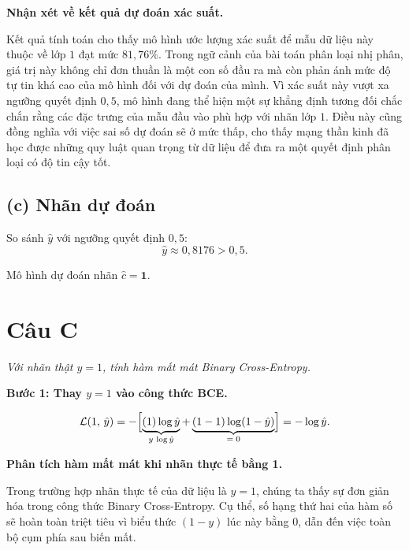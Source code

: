 \documentclass[12pt,a4paper]{article}
\begin{document}
\textbf{Nhận xét về kết quả dự đoán xác suất.}

Kết quả tính toán cho thấy mô hình ước lượng xác suất để mẫu dữ liệu này thuộc về lớp $1$ đạt mức $81,76\%$. Trong ngữ cảnh của bài toán phân loại nhị phân, giá trị này không chỉ đơn thuần là một con số đầu ra mà còn phản ánh mức độ tự tin khá cao của mô hình đối với dự đoán của mình. Vì xác suất này vượt xa ngưỡng quyết định $0,5$, mô hình đang thể hiện một sự khẳng định tương đối chắc chắn rằng các đặc trưng của mẫu đầu vào phù hợp với nhãn lớp $1$. Điều này cũng đồng nghĩa với việc sai số dự đoán sẽ ở mức thấp, cho thấy mạng thần kinh đã học được những quy luật quan trọng từ dữ liệu để đưa ra một quyết định phân loại có độ tin cậy tốt.

\bigskip
\subsection*{(c) Nhãn dự đoán}

So sánh $\hat{y}$ với ngưỡng quyết định $0{,}5$:
\[
  \hat{y} \approx 0{,}8176 > 0{,}5.
\]

\begin{ketqua}
Mô hình dự đoán nhãn $\hat{c} = \mathbf{1}$.
\end{ketqua}

\section*{Câu C}

\noindent\textit{Với nhãn thật $y = 1$, tính hàm mất mát Binary Cross-Entropy.}

\medskip

\noindent\textbf{Bước 1: Thay $y = 1$ vào công thức BCE.}

\[
  \mathcal{L}(1,\,\hat{y})
  = -\Bigl[
      \underbrace{(1)\log\hat{y}}_{y\,\log\hat{y}}
    + \underbrace{(1 - 1)\log(1 - \hat{y})}_{=\;0}
    \Bigr]
  = -\log\hat{y}.
\]

\textbf{Phân tích hàm mất mát khi nhãn thực tế bằng 1.}

Trong trường hợp nhãn thực tế của dữ liệu là $y = 1$, chúng ta thấy sự đơn giản hóa trong công thức Binary Cross-Entropy. Cụ thể, số hạng thứ hai của hàm số sẽ hoàn toàn triệt tiêu vì biểu thức $(1 - y)$ lúc này bằng $0$, dẫn đến việc toàn bộ cụm phía sau biến mất. 
\end{document}
